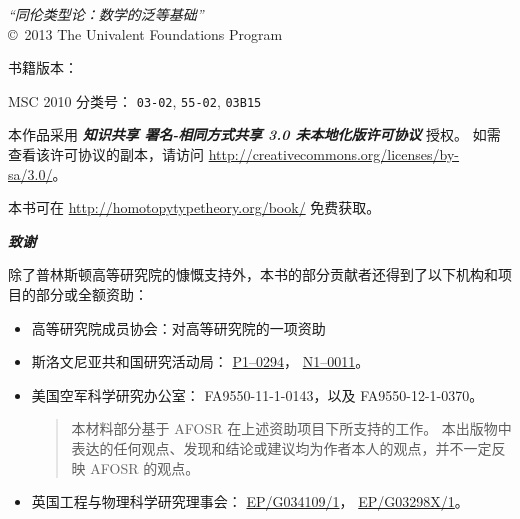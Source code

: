\vfill
\hbox{}

\clearpage
\restoregeometry

\hbox{}
\vfill

{\small
\noindent
\emph{``同伦类型论：数学的泛等基础''}\\
\copyright\ 2013 The Univalent Foundations Program

\medskip
\noindent
书籍版本：\texttt{\OPTversion}

\medskip
\noindent
MSC 2010 分类号：
\texttt{03-02},
\texttt{55-02},
\texttt{03B15}

\bigskip
\footnotesize

\noindent
本作品采用
\textbf{\emph{知识共享 署名-相同方式共享 3.0 未本地化版许可协议}}
授权。
%
如需查看该许可协议的副本，请访问
\url{http://creativecommons.org/licenses/by-sa/3.0/}。

\bigskip

\noindent
本书可在 \url{http://homotopytypetheory.org/book/} 免费获取。

\bigskip

\noindent
\emph{\textbf{\small 致谢}}

\medskip

\noindent
除了普林斯顿高等研究院的慷慨支持外，本书的部分贡献者还得到了以下机构和项目的部分或全额资助：
%
\begin{itemize}
\item 高等研究院成员协会：对高等研究院的一项资助 %
\item 斯洛文尼亚共和国研究活动局：  %
\href{http://www.sicris.si/search/prg.aspx?id=6120}{P1--0294}，
\href{http://www.sicris.si/search/prj.aspx?id=7109}{N1--0011}。

\item 美国空军科学研究办公室：
  FA9550-11-1-0143，以及 %
  FA9550-12-1-0370。  %
  {
    \setlength{\parskip}{0pt}
    \begin{quote}
      \noindent\scriptsize
      本材料部分基于 AFOSR 在上述资助项目下所支持的工作。
      本出版物中表达的任何观点、发现和结论或建议均为作者本人的观点，并不一定反映 AFOSR 的观点。
    \end{quote}
  }

\item 英国工程与物理科学研究理事会： %
   \href{http://gow.epsrc.ac.uk/NGBOViewGrant.aspx?GrantRef=EP/G034109/1}{EP/G034109/1}， %
   \href{http://gow.epsrc.ac.uk/NGBOViewGrant.aspx?GrantRef=EP/G03298X/1}{EP/G03298X/1}。 %


\end{itemize}}
